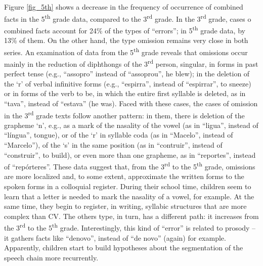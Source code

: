 Figure \ref{fig_5th} shows a decrease in the frequency of occurrence of combined facts in the 5\textsuperscript{th} grade data, compared to the 3\textsuperscript{rd} grade. In the 3\textsuperscript{rd} grade, cases o combined facts account for 24\% of the types of ``errors''; in 5\textsuperscript{th} grade data, by 13\% of them.
On the other hand, the type omission remains very close in both series. An examination of data from the 5\textsuperscript{th} grade reveals that omissions occur mainly in the reduction of diphthongs of the 3\textsuperscript{rd} person, singular, in forms in past perfect tense (e.g., ``assopro'' instead of ``assoprou'', he blew); in the deletion of the `r' of verbal infinitive forms (e.g., ``espirra'', instead of ``espirrar'', to sneeze) or in forms of the verb to be, in which the entire first syllable is deleted, as in ``tava'', instead of ``estava'' (he was). Faced with these cases, the cases of omission in the 3\textsuperscript{rd} grade texts follow another pattern: in them, there is deletion of the grapheme `n', e.g., as a mark of the nasality of the vowel (as in ``ligua'', instead of ``língua'', tongue), or of the `r' in syllable coda (as in ``Macelo'', instead of ``Marcelo''), of the `s' in the same position (as in ``contruir'', instead of ``construir'', to build), or even more than one grapheme, as in ``reportes'', instead of ``repórteres''. These data suggest that, from the 3\textsuperscript{rd} to the 5\textsuperscript{th} grade, omissions are more localized and, to some extent, approximate the written forms to the spoken forms in a colloquial register. During their school time, children seem to learn that a letter is needed to mark the nasality of a vowel, for example. At the same time, they begin to register, in writing, syllabic structures that are more complex than CV.
The others type, in turn, has a different path: it increases from the 3\textsuperscript{rd} to the 5\textsuperscript{th} grade. Interestingly, this kind of ``error'' is related to prosody -- it gathers facts like ``denovo'', instead of ``de novo'' (again) for example. Apparently, children start to build hypotheses about the segmentation of the speech chain more recurrently.





